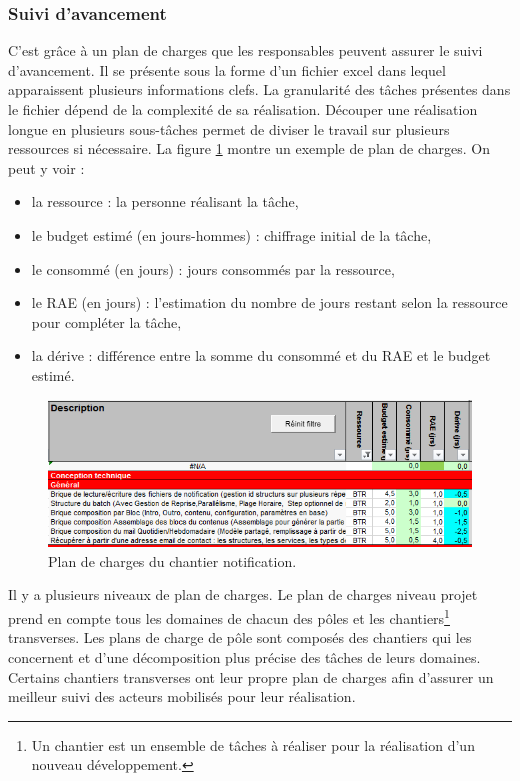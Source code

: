 \documentclass[12pt,a4paper]{article}
\begin{document}
\subsubsection{Suivi d’avancement}
C'est grâce à un plan de charges que les responsables peuvent assurer le suivi d'avancement. Il se présente sous la forme d'un fichier excel dans lequel apparaissent plusieurs informations clefs. La granularité des tâches présentes dans le fichier dépend de la complexité de sa réalisation. Découper une réalisation longue en plusieurs sous-tâches permet de diviser le travail sur plusieurs ressources si nécessaire. La figure \ref{pdc} montre un exemple de plan de charges.
On peut  y voir :
\begin{itemize}
\item la ressource : la personne réalisant la tâche,
\item le budget estimé (en jours-hommes) : chiffrage initial de la tâche,
\item le consommé (en jours) : jours consommés par la ressource,
\item le \gls{RAE} (en jours) : l'estimation du nombre de jours restant selon la ressource pour compléter la tâche,
\item la dérive : différence entre la somme du consommé et du \gls{RAE} et le budget estimé.
\end{itemize}
\begin{figure}[H]
	\begin{center}
		\includegraphics[width=\textwidth,height=\textheight,keepaspectratio]{planDeCharge.png}
		\caption{Plan de charges du chantier notification.}
		\label{pdc}
	\end{center}
\end{figure}
Il y a plusieurs niveaux de plan de charges. Le plan de charges niveau projet prend en compte tous les domaines de chacun des pôles et les chantiers\footnote{Un chantier est un ensemble de tâches à réaliser pour la réalisation d'un nouveau développement.} transverses. Les plans de charge de pôle sont composés des chantiers qui les concernent et d'une décomposition plus précise des tâches de leurs domaines. Certains chantiers transverses ont leur propre plan de charges afin d'assurer un meilleur suivi des acteurs mobilisés pour leur réalisation.
\end{document}
